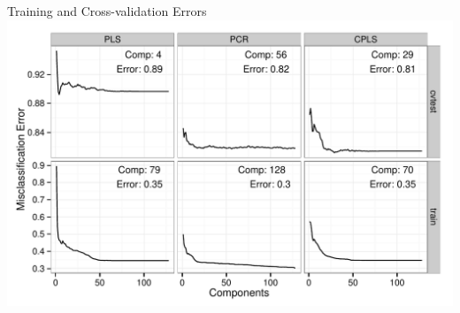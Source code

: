 \documentclass[newPxFont]{beamer}\usepackage[]{graphicx}\usepackage[]{color}
\makeatletter
\def\maxwidth{ %
  \ifdim\Gin@nat@width>\linewidth
    \linewidth
  \else
    \Gin@nat@width
  \fi
}
\newenvironment{knitrout}{}{} %
\makeatother
\begin{document}
\begin{frame}[t]{Training and Cross-validation Errors}
\begin{knitrout}
\color{fgcolor}
\includegraphics[width=\maxwidth]{figure/Set1ErrorPlot__errPlot-1} 

\end{knitrout}
\end{frame}



\end{document}
